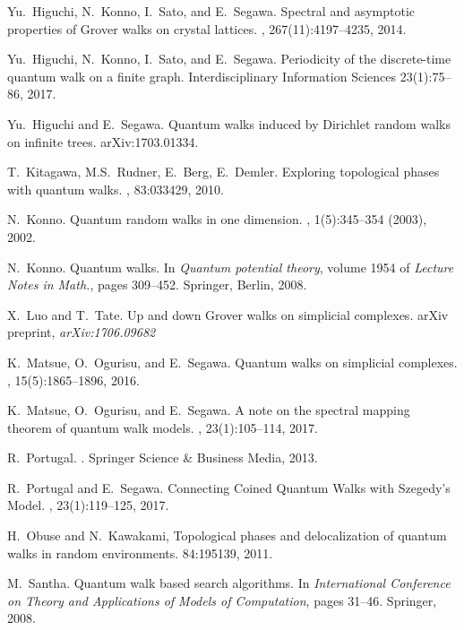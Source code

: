 \documentclass[a4paper,12pt]{article}
\numberwithin{equation}{section}
\begin{document}
\begin{thebibliography}{99}
Yu.~Higuchi, N.~Konno, I.~Sato, and E.~Segawa.
\newblock Spectral and asymptotic properties of {G}rover walks on crystal lattices.
, 267(11):4197--4235, 2014.

Yu.~Higuchi, N.~Konno, I.~Sato, and E.~Segawa.
\newblock Periodicity of the discrete-time quantum walk on a finite graph. 
Interdisciplinary Information Sciences 23(1):75--86, 2017.

Yu.~Higuchi and E.~Segawa. 
\newblock Quantum walks induced by Dirichlet random walks on infinite trees.
\newblock arXiv:1703.01334. 

T.~Kitagawa, M.S.~Rudner, E.~Berg, E.~Demler. 
\newblock  Exploring topological phases with quantum walks.   
, 83:033429, 2010.

N.~Konno.
\newblock Quantum random walks in one dimension.
, 1(5):345--354 (2003), 2002.

N.~Konno.
\newblock Quantum walks.
\newblock In {\em Quantum potential theory}, volume 1954 of {\em Lecture Notes
  in Math.}, pages 309--452. Springer, Berlin, 2008.


X.~Luo and T.~Tate.
\newblock Up and down {G}rover walks on simplicial complexes.
\newblock arXiv preprint, {\em arXiv:1706.09682}

K.~Matsue, O.~Ogurisu, and E.~Segawa.
\newblock Quantum walks on simplicial complexes.
, 15(5):1865--1896, 2016.

K.~Matsue, O.~Ogurisu, and E.~Segawa.
\newblock A note on the spectral mapping theorem of quantum walk models.
, 23(1):105--114, 2017.

R.~Portugal.
.
\newblock Springer Science \& Business Media, 2013.

R.~Portugal and E.~Segawa.
\newblock Connecting {C}oined {Q}uantum {W}alks with {S}zegedy's {M}odel.
, 23(1):119--125, 2017.

H.~Obuse and N.~Kawakami, 
\newblock Topological phases and delocalization of quantum walks in random environments.
 84:195139, 2011.

M.~Santha.
\newblock Quantum walk based search algorithms.
\newblock In {\em International Conference on Theory and Applications of Models
  of Computation}, pages 31--46. Springer, 2008.


\end{thebibliography}
\end{document}
